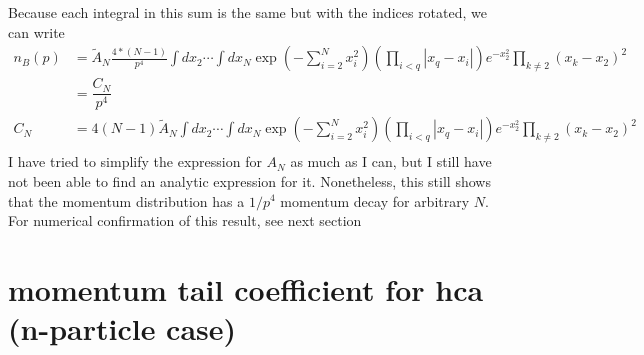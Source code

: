 \documentclass[onecolumn,english,aps,pra]{revtex4}
\begin{document}
Because each integral in this sum is the same but with the indices rotated, we can write
\begin{align*}
n_{B}(p) & = \tilde{A}_{N} \frac{4 * (N - 1)}{p^4} \int dx_{2} \cdots \int dx_{N} 
	\exp\left(- \sum_{i = 2}^{N} x_{i}^2\right) \left( \prod_{ i < q} |x_{q} - x_{i}| \right) 
	e^{-x_{2}^2} \prod_{k \neq 2} (x_{k} - x_{2})^2\\
	& = \dfrac{C_{N}}{p^4}\\
C_{N} & = 4(N - 1)\tilde{A}_{N}  \int dx_{2} \cdots \int dx_{N} 
	\exp\left(- \sum_{i = 2}^{N} x_{i}^2\right) \left( \prod_{ i < q} |x_{q} - x_{i}| \right) 
	e^{-x_{2}^2} \prod_{k \neq 2} (x_{k} - x_{2})^2\\
\end{align*}
I have tried to simplify the expression for $A_{N}$ as much as I can, but I still have not been able to find an analytic expression for it. Nonetheless, this still shows that the momentum distribution has a $1/p^4$ momentum decay for arbitrary $N$. For numerical confirmation of this result, see next section

\section{momentum tail coefficient for hca (n-particle case)}
\end{document}
